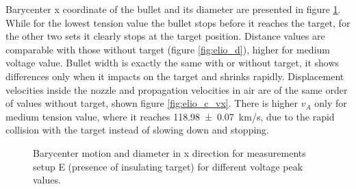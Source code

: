 Barycenter x coordinate of the bullet and its diameter are presented in figure \ref{fig:elio_c_xb}. While for the lowest tension value the bullet stops before it reaches the target, for the other two sets it clearly stops at the target position. Distance values are comparable with those without target (figure \ref{fig:elio_d}), higher for medium voltage value.
Bullet width is exactly the same with or without target, it shows differences only when it impacts on the target and shrinks rapidly.
Displacement velocities inside the nozzle and propagation velocities in air are of the same order of values without target, shown figure \ref{fig:elio_c_vx}. There is higher $v_{A}$ only for medium tension value, where it reaches \SI{118.98(7)}{\kilo\meter/\second}, due to the rapid collision with the target instead of slowing down and stopping.
\begin{figure}
 \centering
 \hfill
 \caption{Barycenter motion and diameter in x direction for measurements setup E (presence of insulating target) for different voltage peak values.}
 \label{fig:elio_c_xb}
\end{figure}

